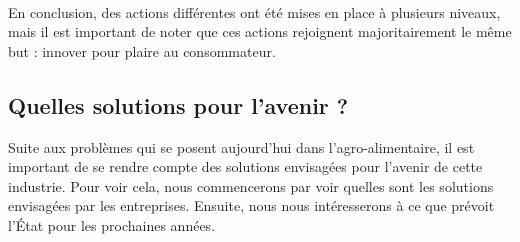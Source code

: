 \documentclass[a4paper,10pt]{report}
\begin{document}
			\paragraph{}En conclusion, des actions différentes ont été mises en place à plusieurs niveaux, mais il est important de noter que ces actions rejoignent majoritairement le même but : innover pour plaire au consommateur.

			
		\subsection{Quelles solutions pour l'avenir ?}
			Suite aux problèmes qui se posent aujourd’hui dans l’agro-alimentaire, il est important de se rendre compte des solutions envisagées pour l’avenir de cette industrie. Pour voir cela, nous commencerons par voir quelles sont les solutions envisagées par les entreprises. Ensuite, nous nous intéresserons à ce que prévoit l’État pour les prochaines années.
			
\end{document}
